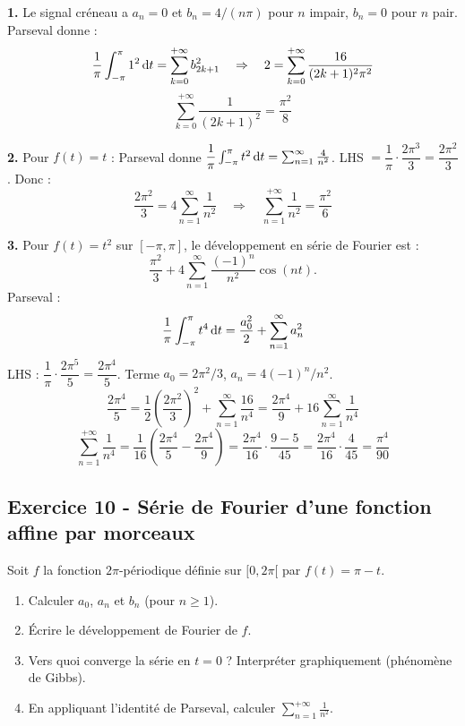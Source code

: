 \documentclass[12pt,a4paper]{article}
\begin{document}
\begin{boitecorrige}
\textbf{1.} Le signal créneau a $a_n = 0$ et $b_n = 4/(n\pi)$ pour $n$ impair, $b_n = 0$ pour $n$ pair. Parseval donne :
\[
\frac{1}{\pi}\int_{-\pi}^\pi 1^2\,\mathrm{d} t = \sum_{k=0}^{+\infty}b_{2k+1}^2 \quad\Rightarrow\quad 2 = \sum_{k=0}^{+\infty}\frac{16}{(2k+1)^2\pi^2}
\]
\[
\boxed{\sum_{k=0}^{+\infty}\frac{1}{(2k+1)^2} = \frac{\pi^2}{8}}
\]

\textbf{2.} Pour $f(t)=t$ : Parseval donne $\dfrac{1}{\pi}\int_{-\pi}^\pi t^2\,\mathrm{d} t = \sum_{n=1}^\infty\frac{4}{n^2}$. LHS $= \dfrac{1}{\pi}\cdot\dfrac{2\pi^3}{3} = \dfrac{2\pi^2}{3}$. Donc :
\[
\frac{2\pi^2}{3} = 4\sum_{n=1}^\infty\frac{1}{n^2} \quad\Rightarrow\quad \boxed{\sum_{n=1}^{+\infty}\frac{1}{n^2} = \frac{\pi^2}{6}}
\]

\textbf{3.} Pour $f(t) = t^2$ sur $[-\pi,\pi]$, le développement
en série de Fourier est :
\[
\dfrac{\pi^2}{3}+4\sum_{n=1}^\infty\dfrac{(-1)^n}{n^2}\cos(nt).
\]
Parseval :
\[
\frac{1}{\pi}\int_{-\pi}^\pi t^4\,\mathrm{d} t = \frac{a_0^2}{2}+\sum_{n=1}^\infty a_n^2
\]
LHS : $\dfrac{1}{\pi}\cdot\dfrac{2\pi^5}{5} = \dfrac{2\pi^4}{5}$. Terme $a_0 = 2\pi^2/3$, $a_n = 4(-1)^n/n^2$.
\[
\frac{2\pi^4}{5} = \frac{1}{2}\!\left(\frac{2\pi^2}{3}\right)^2 + \sum_{n=1}^\infty\frac{16}{n^4} = \frac{2\pi^4}{9} + 16\sum_{n=1}^\infty\frac{1}{n^4}
\]
\[
\sum_{n=1}^{+\infty}\frac{1}{n^4} = \frac{1}{16}\!\left(\frac{2\pi^4}{5} - \frac{2\pi^4}{9}\right) = \frac{2\pi^4}{16}\cdot\frac{9-5}{45} = \frac{2\pi^4}{16}\cdot\frac{4}{45} = \boxed{\frac{\pi^4}{90}}
\]
\end{boitecorrige}

\subsection*{Exercice 10 - Série de Fourier d'une fonction affine par morceaux \niveau{\moyen}}

\begin{boiteexercice}
Soit $f$ la fonction $2\pi$-périodique définie sur $[0, 2\pi[$ par $f(t) = \pi - t$.
\begin{enumerate}
  \item Calculer $a_0$, $a_n$ et $b_n$ (pour $n\geq1$).
  \item Écrire le développement de Fourier de $f$.
  \item Vers quoi converge la série en $t = 0$ ? Interpréter graphiquement (phénomène de Gibbs).
  \item En appliquant l'identité de Parseval, calculer $\displaystyle\sum_{n=1}^{+\infty}\frac{1}{n^2}$.
\end{enumerate}
\end{boiteexercice}
\end{document}
